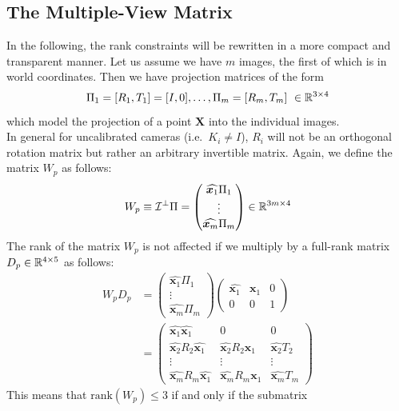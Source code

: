 \subsection{The Multiple-View Matrix}%
\label{sub:the_multiple_view_matrix}


In the following, the rank constraints will be rewritten in a more compact
and transparent manner. Let us assume we have $m$ images, the first of which
is in world coordinates. Then we have projection matrices of the form
\[
	\Pi_1 = [R_1,T_1] = [I,0], \ldots, \Pi_m = [R_m, T_m] \ \in \mathbb{R}^{3 \times{} 4}
\]
which model the projection of a point $\bm{X}$ into the individual images.\\

In general for uncalibrated cameras (i.e.\ $K_i \neq I$), $R_i$ will not be
an orthogonal rotation matrix but rather an arbitrary invertible matrix.
Again, we define the matrix $W_p$ as follows:
\[
	W_p \equiv \mathcal{I}^{\bot} \Pi = \begin{pmatrix}
		\widehat{\bm{x}_1} \Pi_1 \\ \vdots \\ \widehat{\bm{x}_m} \Pi_m
	\end{pmatrix}
	\in \mathbb{R}^{3m \times{} 4}
\]
The rank of the matrix $W_p$ is not affected if we multiply by
a full-rank matrix $D_p \in \mathbb{R}^{4 \times{} 5}$ as follows:
\begin{align*}
	W_p D_p
		&= \begin{pmatrix}
				\widehat{\bm{x}_1} \Pi_1 \\ \vdots \\ \widehat{\bm{x}_m} \Pi_m
			\end{pmatrix}
			\begin{pmatrix}
				\widehat{\bm{x}_1} & \bm{x}_1 & 0 \\
				0 & 0 & 1
			\end{pmatrix} \\
		&= \begin{pmatrix}
				\widehat{\bm{x}_1} \widehat{\bm{x}_1} & 0 & 0 \\
				\widehat{\bm{x}_2} R_2 \widehat{\bm{x}_1}
					& \widehat{\bm{x}_2} R_2 \bm{x}_1
					& \widehat{\bm{x}_2} T_2 \\
				\vdots & \vdots & \vdots \\
				\widehat{\bm{x}_m} R_m \widehat{\bm{x}_1}
					& \widehat{\bm{x}_m} R_m \bm{x}_1
					& \widehat{\bm{x}_m} T_m
			\end{pmatrix}
\end{align*}
This means that $\text{rank}(W_p) \leq 3$ if and only if the submatrix
